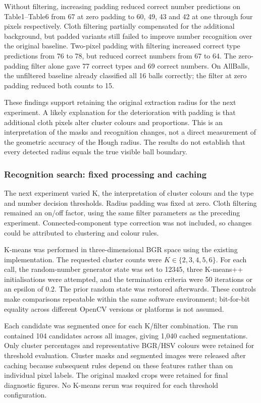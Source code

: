 

Without filtering, increasing padding reduced correct number predictions on
Table1--Table6 from 67 at zero padding to 60, 49, 43 and 42 at one through
four pixels respectively. Cloth filtering partially compensated for the
additional background, but padded variants still failed to improve number
recognition over the original baseline. Two-pixel padding with filtering
increased correct type predictions from 76 to 78, but reduced correct numbers
from 67 to 64. The zero-padding filter alone gave 77 correct types and 69
correct numbers. On AllBalls, the unfiltered baseline already classified all
16 balls correctly; the filter at zero padding reduced both counts to 15.

These findings support retaining the original extraction radius for the next
experiment. A likely explanation for the deterioration with padding is that
additional cloth pixels alter cluster colours and proportions. This is an
interpretation of the masks and recognition changes, not a direct measurement
of the geometric accuracy of the Hough radius. The results do not establish
that every detected radius equals the true visible ball boundary.

\subsubsection{Recognition search: fixed processing and caching}

The next experiment varied K, the interpretation of cluster colours and the
type and number decision thresholds. Radius padding was fixed at zero.
Cloth filtering remained an on/off factor, using the same filter parameters
as the preceding experiment. Connected-component type correction was not
included, so changes could be attributed to clustering and colour rules.

K-means was performed in three-dimensional BGR space using the existing
implementation. The requested cluster counts were $K\in\{2,3,4,5,6\}$.
For each call, the random-number generator state was set to 12345, three
K-means++ initialisations were attempted, and the termination criteria were
50 iterations or an epsilon of 0.2. The prior random state was restored
afterwards. These controls make comparisons repeatable within the same
software environment; bit-for-bit equality across different OpenCV versions
or platforms is not assumed.

Each candidate was segmented once for each K/filter combination. The run
contained 104 candidates across all images, giving 1,040 cached segmentations.
Only cluster percentages and representative BGR/HSV colours were retained
for threshold evaluation. Cluster masks and segmented images were released
after caching because subsequent rules depend on these features rather than
on individual pixel labels. The original masked crops were retained for
final diagnostic figures. No K-means rerun was required for each threshold
configuration.

